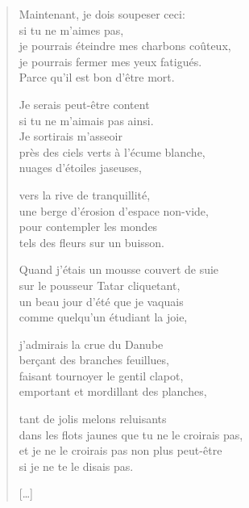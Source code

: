 \documentclass[11pt]{extbook}
\newcommand*{\centeredornament}{\centerline{\pgfornament[width=6cm]{88}}}
\begin{document}
\newpage


\vspace*{-15mm}
\centeredornament



\begin{verse}
  Maintenant, je dois soupeser ceci: \\
  si tu ne m'aimes pas, \\
  je pourrais éteindre mes charbons coûteux, \\
  je pourrais fermer mes yeux fatigués. \\
  Parce qu'il est bon d'être mort.

  Je serais peut-être content \\
  si tu ne m'aimais pas ainsi. \\
  Je sortirais m'asseoir \\
  près des ciels verts à l'écume blanche, \\
  nuages d'étoiles jaseuses,

  vers la rive de tranquillité, \\
  une berge d'érosion d'espace non-vide, \\
  pour contempler les mondes \\
  tels des fleurs sur un buisson.

  Quand j'étais un mousse couvert de suie \\
  sur le pousseur Tatar cliquetant, \\
  un beau jour d'été que je vaquais \\
  comme quelqu'un étudiant la joie,

  j'admirais la crue du Danube \\
  berçant des branches feuillues, \\
  faisant tournoyer le gentil clapot, \\
  emportant et mordillant des planches,

  tant de jolis melons reluisants \\
  dans les flots jaunes que tu ne le croirais pas, \\
  et je ne le croirais pas non plus peut-être \\
  si je ne te le disais pas.

  \hfill [\ldots]
\end{verse}
\end{document}
